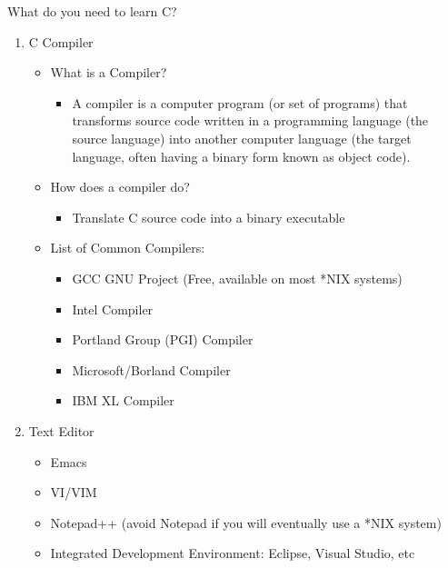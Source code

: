 \documentclass[10pt,t]{beamer}
\begin{document}
\begin{frame}{What do you need to learn C?}
  \begin{enumerate}
    \item {C Compiler}
      \begin{itemize}
        \item What is a Compiler?
          \begin{itemize}
            \item A compiler is a computer program (or set of programs) that transforms source code written in a programming language (the source language) into another computer language (the target language, often having a binary form known as object code).
          \end{itemize}
        \item How does a compiler do?
          \begin{itemize}
            \item Translate C source code into a binary executable
          \end{itemize}
        \item List of Common Compilers:
          \begin{itemize}
            \item GCC GNU Project (Free, available on most *NIX systems)
            \item Intel Compiler
            \item Portland Group (PGI) Compiler
            \item Microsoft/Borland Compiler
            \item IBM XL Compiler
          \end{itemize}
      \end{itemize}
    \item {Text Editor}
      \begin{itemize}
        \item Emacs
        \item VI/VIM
        \item Notepad++ (avoid Notepad if you will eventually use a *NIX system)
        \item Integrated Development Environment: Eclipse, Visual Studio, etc
      \end{itemize}
  \end{enumerate}
\end{frame}
\end{document}
